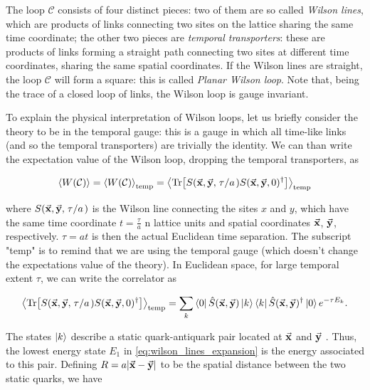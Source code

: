 \documentclass[reqno,12pt]{article}
\numberwithin{equation}{section}
\begin{document}
The loop $\mathcal{C}$ consists of four distinct pieces: two of them are so called \textit{Wilson lines}, which are 
products of links connecting two sites on the lattice sharing the same time coordinate; the other two pieces
are \textit{temporal transporters}: these are products of links forming a straight path connecting two sites at
different time coordinates, sharing the same spatial coordinates. If the Wilson lines are straight, the loop
$\mathcal{C}$ will form a square: this is called \textit{Planar Wilson loop}. Note that, being the trace of a closed
loop of links, the Wilson loop is gauge invariant.

To explain the physical interpretation of Wilson loops, let us briefly consider the theory to be in the temporal
gauge: this is a gauge in which all time-like links (and so the temporal transporters) are trivially the identity.
We can than write the expectation value of the Wilson loop, dropping the temporal transporters, as 

\begin{equation}
	\expval{W(\mathcal{C})} = \expval{W(\mathcal{C})}_\text{temp} = 
	\expval{\Tr[S(\va{x}, \va{y}, \flatfrac{\tau}{a})S(\va{x}, \va{y}, 0)^\dagger]}_\text{temp}
\end{equation}

where $S(\va{x}, \va{y}, \flatfrac{\tau}{a})$ is the Wilson line connecting the sites $x$ and $y$, which have the same time
coordinate $t = \frac{\tau}{a}$ n lattice units and spatial coordinates $\va{x}$, $\va{y}$, respectively. $\tau = at$ is then
the actual Euclidean time separation. The subscript "temp" is to
remind that we are using the temporal gauge (which doesn't change the expectations value of the theory). 
In Euclidean space, for large temporal extent $\tau$, we can write the correlator as

\begin{equation} \label{eq:wilson_lines_expansion}
	\expval{\Tr[S(\va{x}, \va{y}, \flatfrac{\tau}{a})S(\va{x}, \va{y}, 0)^\dagger]}_\text{temp} = 
	\sum_k \bra{0}\hat{S}(\va{x}, \va{y})\ket{k}\bra{k}\hat{S}(\va{x}, \va{y})^\dagger\ket{0} e^{-\tau E_k}.
\end{equation}

The states $\ket{k}$ describe a static quark-antiquark pair located at $\va{x}$ and $\va{y}$ \cite{gattringer}. 
Thus, the lowest energy state $E_1$ in \eqref{eq:wilson_lines_expansion} is the energy associated to this pair. 
Defining $R = a|\va{x} - \va{y}|$ to be the spatial distance between the two static quarks, we have
\end{document}

